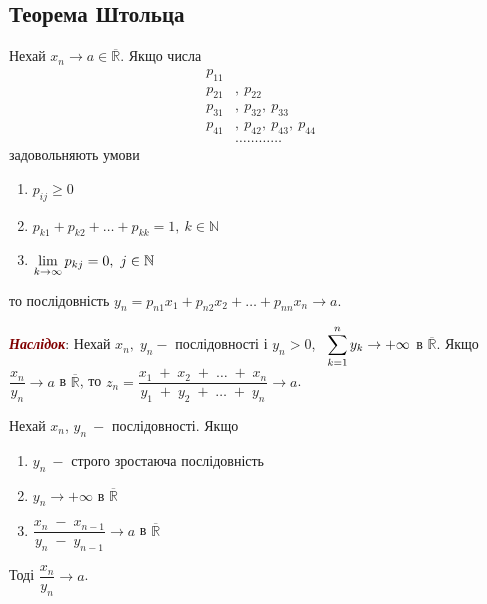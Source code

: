 \subsection{\large{Теорема Штольца}}
\begin{theorem}
         Нехай $x_n \to a \in \mathbb{\overline{R}}$. Якщо числа \newline
\begin{equation}
      \label{ep:1.1}
      \begin{aligned}
          p_{11} \\
          p_{21} &, \ p_{22} \\
          p_{31} &, \ p_{32} , \ p_{33} \\
          p_{41} &, \ p_{42}  , \ p_{43} , \ p_{44} \\
           & \ldots\ldots\ldots\ldots    
        \end{aligned}
    \end{equation}
     задовольняють умови
      \begin{enumerate}
       \item $p_{ij} \geqslant  0$
       \item $p_{k1} + p_{k2} + \ldots + p_{kk} = 1, \ k \in \mathbb{N}$
       \item $\displaystyle\lim\limits_{k \to \infty} p_{kj} = 0, \ j \in \mathbb{N}$
        \end{enumerate}
        то послідовність $y_n = p_{n1}x_1 + p_{n2}x_2 + \ldots + p_{nn}x_n \to a$.
         \item \textcolor{Maroon}{\textbf{\textit{{{\textbf{\textit{Наслідок}}}}}}}: Нехай $x_n, \; y_n -$ послідовності і $y_n > 0$,  \ $\displaystyle\sum\limits_{k=1}^n y_k \to +\infty$ в $\mathbb{\overline{R}}$. Якщо $\dfrac{x_n}{y_n} \to a$ в $\mathbb{\overline{R}}$, то \newline $z_n = \dfrac{x_1 \; + \; x_2 \; + \;  \ldots \; + \; x_n}{y_1 \; + \; y_2  \; + \; \ldots \; + \; y_n} \to a$.
\end{theorem}

\begin{theorem}
        Нехай $x_n$, $y_n \: -$ послідовності. Якщо
        \begin{enumerate}
            \item $y_n \: -$ строго зростаюча послідовність
            \item $y_n \to +\infty$ в $\mathbb{\overline{R}}$
            \item $\dfrac{x_n \;- \; x_{n-1}}{y_n \; - \; y_{n-1}} \to a$ в $\mathbb{\overline{R}}$
        \end{enumerate}
        Тоді $\dfrac{x_n}{y_n} \to a$.
\end{theorem}

